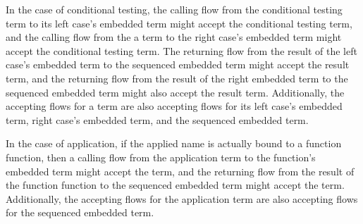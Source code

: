 \documentclass[10pt]{article}
\begin{document}
In the case of conditional testing, the calling flow from the conditional testing term to
its left case's embedded term might accept the conditional testing term, and
the calling flow from the a term to
the right case's embedded term might accept the conditional testing term.
The returning flow from the result of the
left case's embedded term to the sequenced embedded term might accept the result term,
and the returning flow from the result of the right embedded term to the sequenced embedded term
might also accept the result term.  Additionally, the accepting flows for a term are also
accepting flows for its left case's embedded term, right case's embedded term,
and the sequenced embedded term.   

In the case of application, if the applied name is actually bound to a function
function, then a calling flow from the application term to the function's embedded term
might accept the term, and the returning flow from the result of the function
function to the sequenced embedded term might accept the term.
Additionally, the accepting flows for the application term are also
accepting flows for the sequenced embedded term. 
\end{document}

